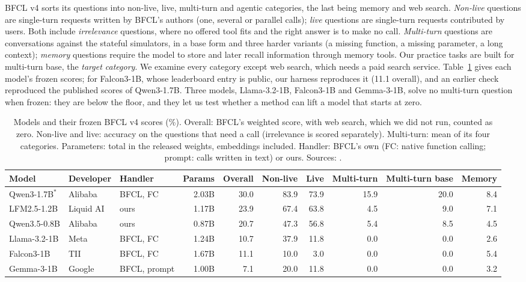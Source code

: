 \documentclass[a4paper,fleqn]{cas-dc}
\begin{document}
BFCL v4 sorts its questions into non-live, live, multi-turn and agentic categories, the last being memory and web search. \emph{Non-live} questions are single-turn requests
written by BFCL's authors (one, several or parallel calls); \emph{live} questions are single-turn requests contributed by
users. Both include \emph{irrelevance} questions, where no offered tool fits and the right answer is to make no call.
\emph{Multi-turn} questions are conversations against the stateful simulators, in a base form and three harder variants
(a missing function, a missing parameter, a long context); \emph{memory} questions require the model to store and later
recall information through memory tools. Our practice tasks are built for multi-turn base, the \emph{target category}.
We examine every category except web search, which needs a paid search service. Table~\ref{tab:models} gives each
model's frozen scores; for Falcon3-1B, whose leaderboard entry is public, our harness reproduces it (11.1 overall), and an earlier check
reproduced the published scores of Qwen3-1.7B.
Three models, Llama-3.2-1B, Falcon3-1B and Gemma-3-1B, solve no multi-turn question when frozen: they are below the
floor, and they let us test whether a method can lift a model that starts at zero.

\begin{table}[t]
\centering
\caption{Models and their frozen BFCL v4 scores (\%). Overall: BFCL's weighted score, with web search, which we did not run, counted as zero. Non-live and live: accuracy on
the questions that need a call (irrelevance is scored separately). Multi-turn: mean of its four categories. Parameters: total in the released weights, embeddings included. Handler: BFCL's own (FC: native
function calling; prompt: calls written in text) or ours. Sources:
\citep{yang2025qwen3,amini2025lfm2,liquidai2026introducing,qwenteam2026qwen35,meta2024llama32,falconllmteam2024falcon,gemmateam2025gemma}.}\label{tab:models}
\small
\begin{tabular}{@{}lllrrrrrrr@{}}
\toprule
Model & Developer & Handler & Params & Overall & Non-live & Live & Multi-turn & Multi-turn base & Memory \\
\midrule
Qwen3-1.7B$^{\ast}$ & Alibaba   & BFCL, FC     & 2.03B & 30.0 & 83.9 & 73.9 & 15.9 & 20.0 & 8.4 \\
LFM2.5-1.2B         & Liquid AI & ours         & 1.17B & 23.9 & 67.4 & 63.8 &  4.5 &  9.0 & 7.1 \\
Qwen3.5-0.8B        & Alibaba   & ours         & 0.87B & 20.7 & 47.3 & 56.8 &  5.4 &  8.5 & 4.5 \\
Llama-3.2-1B        & Meta      & BFCL, FC     & 1.24B & 10.7 & 37.9 & 11.8 &  0.0 &  0.0 & 2.6 \\
Falcon3-1B          & TII       & BFCL, FC     & 1.67B & 11.1 & 10.0 &  3.0 &  0.0 &  0.0 & 5.4 \\
Gemma-3-1B          & Google    & BFCL, prompt & 1.00B &  7.1 & 20.0 & 11.8 &  0.0 &  0.0 & 3.2 \\
\bottomrule
\end{tabular}
\par{}
\end{table}
\end{document}
